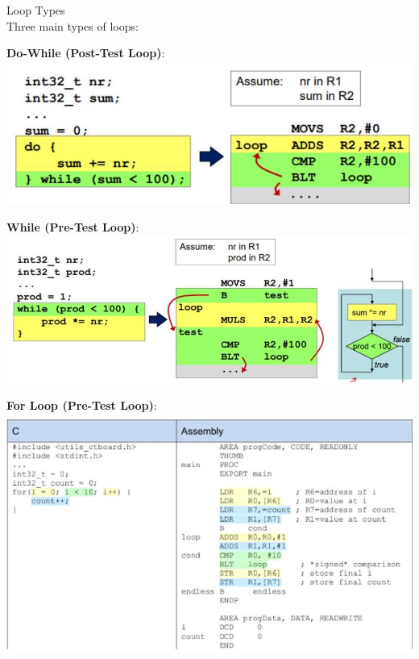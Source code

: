 \begin{concept}{Loop Types}\\
Three main types of loops:

\textbf{Do-While (Post-Test Loop)}:
\includegraphics[width=\linewidth]{images/2024_12_29_79e6b22f503fb7b4f718g-07}

\textbf{While (Pre-Test Loop)}:
\includegraphics[width=\linewidth]{images/2024_12_29_79e6b22f503fb7b4f718g-07(1)}

\textbf{For Loop (Pre-Test Loop)}:
\includegraphics[width=\linewidth]{images/2024_12_29_79e6b22f503fb7b4f718g-07(2)}
\end{concept}

